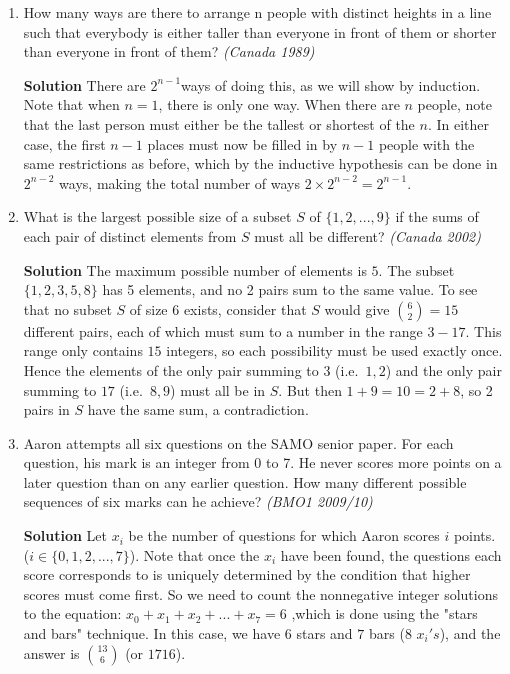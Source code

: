 \documentclass[10pt,a4paper]{article}
\begin{document}
\begin{enumerate}

\item How many ways are there to arrange n people with distinct heights in a line such that everybody is either taller than everyone in front of them or shorter than everyone in front of them?
 \textit{(Canada 1989)} 

\textbf{Solution} There are ${2}^{n-1}$ways of doing this, as we will show by induction. Note that when $n=1$, there is only one way. When there are $n$ people, note that the last person must either be the tallest or shortest of the $n$. In either case, the first $n-1$ places must now be filled in by $n-1$ people with the same restrictions as before, which by the inductive hypothesis can be done in $2^{n-2}$ ways, making the total number of ways $2\times 2^{n-2} = 2^{n-1}$.

\item What is the largest possible size of a subset $S$ of $\{1,2,...,9\}$ if the sums of each pair of distinct elements from $S$ must all be different? 
\textit{(Canada 2002)}

\textbf{Solution} The maximum possible number of elements is $5$. The subset $\{1,2,3,5,8\}$ has 5 elements, and no 2 pairs sum to the same value. To see that no subset $S$ of size 6 exists, consider that $S$ would give $\binom{6}{2} = 15$ different pairs, each of which must sum to a number in the range $3-17$. This range only contains $15$ integers, so each possibility must be used exactly once. Hence the elements of the only pair summing to $3$ (i.e.~$1,2$) and the only pair summing to $17$ (i.e.~$8,9$) must all be in $S$. But then $1+9=10=2+8$, so 2 pairs in $S$ have the same sum, a contradiction.

\item Aaron attempts all six questions on the SAMO senior paper. For each question, his mark is an integer from 0 to 7. He never scores more points on a later question than on any earlier question. How many different possible sequences of six marks can he achieve? 
\textit{(BMO1 2009/10)}

\textbf{Solution} Let $x_i$ be the number of questions for which Aaron scores $i$ points. ($i\in\{0,1,2,...,7\}$). Note that once the $x_i$ have been found, the questions each score corresponds to is uniquely determined by the condition that higher scores must come first. So we need to count the nonnegative integer solutions to the equation: $x_0 + x_1 + x_2 + ... + x_7 = 6$ ,which is done using the "stars and bars" technique. In this case, we have $6$ stars and $7$ bars ($8$ $x_i's$), and the answer is $\binom{13}{6}$ (or $1716$).


\end{enumerate}
\end{document}

